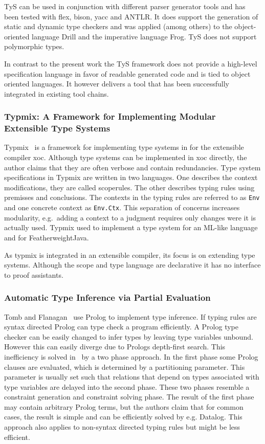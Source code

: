 TyS can be used in conjunction with different parser generator tools
and has been tested with flex, bison, yacc and ANTLR. It does support
the generation of static and dynamic type checkers and was applied
(among others) to the object-oriented language Drill and the
imperative language Frog. TyS does not support polymorphic types.

In contrast to the present work the TyS framework does not provide a
high-level specification language in favor of readable generated code
and is tied to object oriented languages. It however delivers a tool
that has been successfully integrated in existing tool chains.
\subsubsection{Typmix: A Framework for Implementing Modular Extensible Type
  Systems}
Typmix~\cite{bergan2007typmix} is a framework for implementing type
systems in for the extensible compiler xoc. Although type systems can
be implemented in xoc directly, the author claims that they are often
verbose and contain redundancies. Type system specifications in Typmix
are written in two languages. One describes the context modifications,
they are called scoperules. The other describes typing rules using
premisses and conclusions. The contexts in the typing rules are
referred to as \verb|Env| and one concrete context as
\verb|Env.Ctx|. This separation of concerns increases modularity,
e.g.\ adding a context to a judgment requires only changes were it is
actually used. Typmix used to implement a type system for an ML-like
language and for FeatherweightJava.

As typmix is integrated in an extensible compiler, its focus is on
extending type systems. Although the scope and type language are
declarative it has no interface to proof assistants.

\subsubsection{Automatic Type Inference via Partial Evaluation}
Tomb and Flanagan~\cite{tomb2005automatic} use Prolog to implement
type inference. If typing rules are syntax directed Prolog can type
check a program efficiently. A Prolog type checker can be easily
changed to infer types by leaving type variables unbound. However this
can easily diverge due to Prologs depth-first search. This
inefficiency is solved in~\cite{tomb2005automatic} by a two phase
approach. In the first phase some Prolog clauses are evaluated, which
is determined by a partitioning parameter. This parameter is usually
set such that relations that depend on types associated with type
variables are delayed into the second phase. These two phases resemble
a constraint generation and constraint solving phase. The result of
the first phase may contain arbitrary Prolog terms, but the authors
claim that for common cases, the result is simple and can be
efficiently solved by e.g. Datalog. This approach also applies to
non-syntax directed typing rules but might be less efficient.


